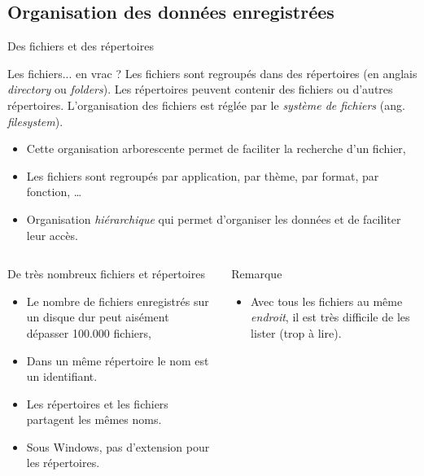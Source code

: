 \subsection{Organisation des données enregistrées}
\begin{frame}{Des fichiers et des répertoires}
  \begin{block}{Les fichiers... en vrac ?}
    Les fichiers sont regroupés dans des répertoires (en anglais
    \emph{directory} ou \emph{folders}). Les répertoires peuvent
    contenir des fichiers ou d'autres répertoires. L'organisation des
    fichiers est réglée par le \emph{système de fichiers}
    (ang. \emph{filesystem}).

    \begin{itemize}
    \item Cette organisation arborescente permet de faciliter la
      recherche d'un fichier,
    \item Les fichiers sont regroupés par application, par thème, par
      format, par fonction, \dots
    \item Organisation \emph{hiérarchique} qui permet d'organiser les données et
      de faciliter leur accès.
    \end{itemize}
  \end{block}
  \begin{columns}
    \begin{column}{.7\linewidth}
      \begin{block}{De très nombreux fichiers et répertoires}
        \begin{itemize}
        \item[\ddialoginformation] Le nombre de fichiers enregistrés sur un disque dur peut
          aisément dépasser 100.000 fichiers,
        \item Dans un même répertoire le nom est un identifiant.
        \item Les répertoires et les fichiers partagent les mêmes noms.
        \item[\dialogwarning] Sous Windows, pas d'extension pour les répertoires.
        \end{itemize}
      \end{block}
    \end{column}%
    \begin{column}{.25\linewidth}
      \begin{alertblock}{Remarque}
        \begin{itemize}
        \item[\dialogerror] Avec tous les fichiers au même
          \textit{endroit}, il est très difficile de les lister (trop à
          lire).
        \end{itemize}
      \end{alertblock}
    \end{column}
  \end{columns}
\end{frame}

